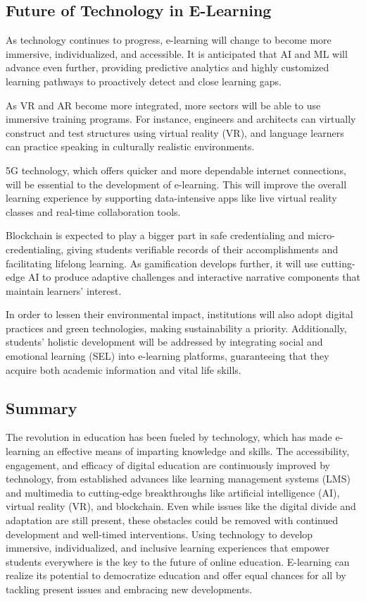 \documentclass[BTech]{audiss}
\begin{document}
\subsection{Future of Technology in E-Learning}
As technology continues to progress, e-learning will change to become more immersive, individualized, and accessible. It is anticipated that AI and ML will advance even further, providing predictive analytics and highly customized learning pathways to proactively detect and close learning gaps.

As VR and AR become more integrated, more sectors will be able to use immersive training programs. For instance, engineers and architects can virtually construct and test structures using virtual reality (VR), and language learners can practice speaking in culturally realistic environments.

5G technology, which offers quicker and more dependable internet connections, will be essential to the development of e-learning. This will improve the overall learning experience by supporting data-intensive apps like live virtual reality classes and real-time collaboration tools.

Blockchain is expected to play a bigger part in safe credentialing and micro-credentialing, giving students verifiable records of their accomplishments and facilitating lifelong learning. As gamification develops further, it will use cutting-edge AI to produce adaptive challenges and interactive narrative components that maintain learners' interest.

In order to lessen their environmental impact, institutions will also adopt digital practices and green technologies, making sustainability a priority. Additionally, students' holistic development will be addressed by integrating social and emotional learning (SEL) into e-learning platforms, guaranteeing that they acquire both academic information and vital life skills.

\subsection{Summary}
The revolution in education has been fueled by technology, which has made e-learning an effective means of imparting knowledge and skills. The accessibility, engagement, and efficacy of digital education are continuously improved by technology, from established advances like learning management systems (LMS) and multimedia to cutting-edge breakthroughs like artificial intelligence (AI), virtual reality (VR), and blockchain. Even while issues like the digital divide and adaptation are still present, these obstacles could be removed with continued development and well-timed interventions. Using technology to develop immersive, individualized, and inclusive learning experiences that empower students everywhere is the key to the future of online education. E-learning can realize its potential to democratize education and offer equal chances for all by tackling present issues and embracing new developments.
\newpage
\end{document}
